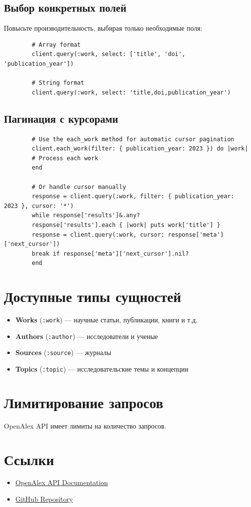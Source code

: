 \documentclass[a4paper,12pt]{article}
\begin{document}
	\subsection{Выбор конкретных полей}
	
	Повысьте производительность, выбирая только необходимые поля:
	
	\begin{lstlisting}
		# Array format
		client.query(:work, select: ['title', 'doi', 'publication_year'])
		
		# String format
		client.query(:work, select: 'title,doi,publication_year')
	\end{lstlisting}
	
	\subsection{Пагинация с курсорами}
	
	\begin{lstlisting}
		# Use the each_work method for automatic cursor pagination
		client.each_work(filter: { publication_year: 2023 }) do |work|
		# Process each work
		end
		
		# Or handle cursor manually
		response = client.query(:work, filter: { publication_year: 2023 }, cursor: '*')
		while response['results']&.any?
		response['results'].each { |work| puts work['title'] }
		response = client.query(:work, cursor: response['meta']['next_cursor'])
		break if response['meta']['next_cursor'].nil?
		end
	\end{lstlisting}
	
	\section{Доступные типы сущностей}
	
	\begin{itemize}
		\item \textbf{Works} (\texttt{:work}) — научные статьи, публикации, книги и т.д.
		\item \textbf{Authors} (\texttt{:author}) — исследователи и ученые
		\item \textbf{Sources} (\texttt{:source}) — журналы
		\item \textbf{Topics} (\texttt{:topic}) — исследовательские темы и концепции
	\end{itemize}
	
	
	\section{Лимитирование запросов}
	
	OpenAlex API имеет лимиты на количество запросов.
	
	
	\section{Ссылки}
	
	\begin{itemize}
		\item \href{https://docs.openalex.org/}{OpenAlex API Documentation}
		\item \href{https://github.com/ZubtsoVA/open_alex_wrap}{GitHub Repository}
	\end{itemize}
	
\end{document}
